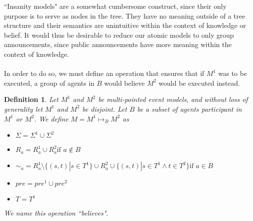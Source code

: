 \documentclass[12pt, a4paper, titlepage]{article}
\newtheorem{defn}{Definition}[subsection]
\numberwithin{equation}{section}
\newcommand{\FIXME}{{\bf FIXME}}
\begin{document}
``Insanity models" are a somewhat cumbersome construct, since their only purpose
is to serve as nodes in the tree.
They have no meaning outside of a tree structure and their semantics are
unintuitive within the context of knowledge or belief.
It would thus be desirable to reduce our atomic models to only group
announcements, since public announcements have more meaning within the context of
knowledge.\\
\\
In order to do so, we must define an operation that ensures that if $M^1$ was to
be executed, a group of agents in $B$ would believe $M^2$ would be executed
instead.
\begin{defn} \label{believes}
Let $M^1$ and $M^2$ be multi-pointed event models, and without loss of
generality let $M^1$ and $M^2$ be disjoint.
Let $B$ be a subset of agents participant in $M^1$ or $M^2$.
We define $M = M^1 \mapsto_B M^2$ as 
\begin{itemize}
  \item $\Sigma = \Sigma^1 \cup \Sigma^2$
  \item $R_a =
    R^1_a \cup R^2_a \text{if } a \notin B$
	\item $\sim_a =
      R^1_a \setminus \{(s,t) | s \in T^1 \} \cup
      R^2_a \cup
      \{(s,t) | s \in T^1 \land t \in T^2 \}
    \text{if } a \in B$
  \item $pre = pre^1 \cup pre^2$
  \item $T = T^1$
\end{itemize}
We name this operation ``believes".
\end{defn}
\end{document}
